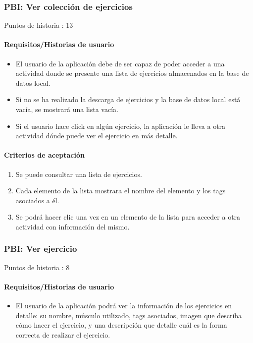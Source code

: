 \documentclass[11pt,a4paper]{report}
\begin{document}
\subsubsection{PBI: Ver colección de ejercicios}
Puntos de historia : 13
\paragraph{Requisitos/Historias de usuario}
\begin{itemize}
	\item El usuario de la aplicación debe de ser capaz de poder acceder a una actividad donde se presente una lista de ejercicios almacenados en la base de datos local.
	\item Si no se ha realizado la descarga de ejercicios y la base de datos local está vacía, se mostrará una lista vacía.
	\item Si el usuario hace click en algún ejercicio, la aplicación le lleva a otra actividad dónde puede ver el ejercicio en más detalle.
\end{itemize}
\paragraph{Criterios de aceptación}
\begin{enumerate}
	\item Se puede consultar una lista de ejercicios.
	\item Cada elemento de la lista mostrara el nombre del elemento y los tags asociados a él.
	\item Se podrá hacer clic una vez en un elemento de la lista para acceder a otra actividad con información del mismo.
\end{enumerate}
\subsubsection{PBI: Ver ejercicio}
Puntos de historia : 8
\paragraph{Requisitos/Historias de usuario}
\begin{itemize}
	\item El usuario de la aplicación podrá ver la información de los ejercicios en detalle: su nombre, músculo utilizado, tags asociados,  imagen que describa cómo hacer el ejercicio, y una descripción que detalle cuál es la forma correcta de realizar el ejercicio.
\end{itemize}
\end{document}
